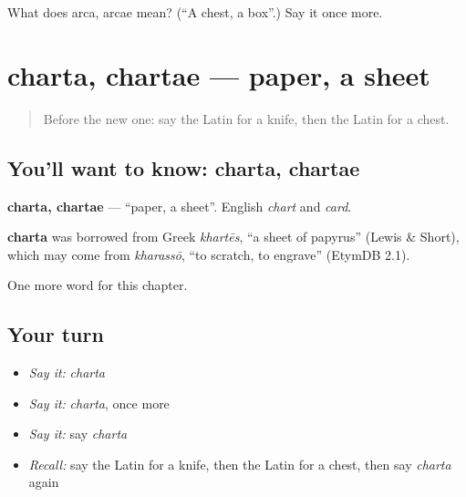 \begin{tcolorbox}[breakable,colback=teal!4,colframe=teal!35!black,title={Before you move on}]
What does arca, arcae mean? (\textquotedblleft{}A chest, a box\textquotedblright{}.) Say it once more.
\end{tcolorbox}
\section[charta, chartae]{charta, chartae — paper, a sheet}

\label{lesson:LA-C84-charta}



\begin{quote}
Before the new one: say the Latin for a knife, then the Latin for a chest.
\end{quote}

\subsection*{You'll want to know: charta, chartae}
\textbf{charta, chartae} — \textquotedblleft{}paper, a sheet\textquotedblright{}. English \emph{chart} and \emph{card}.

\begin{cousinweb}
\textbf{charta} was borrowed from Greek \emph{khartēs}, \textquotedblleft{}a sheet of papyrus\textquotedblright{} (Lewis \& Short), which may come from \emph{kharassō}, \textquotedblleft{}to scratch, to engrave\textquotedblright{} (EtymDB 2.1).
\end{cousinweb}

\begin{grammarlens}[title={What you've built}]
One more word for this chapter.
\end{grammarlens}

\subsection*{Your turn}
\begin{itemize}
\raggedright
  \item \emph{Say it:} \emph{charta}
  \item \emph{Say it:} \emph{charta}, once more
  \item \emph{Say it:} say \emph{charta}
  \item \emph{Recall:} say the Latin for a knife, then the Latin for a chest, then say \emph{charta} again
\end{itemize}

